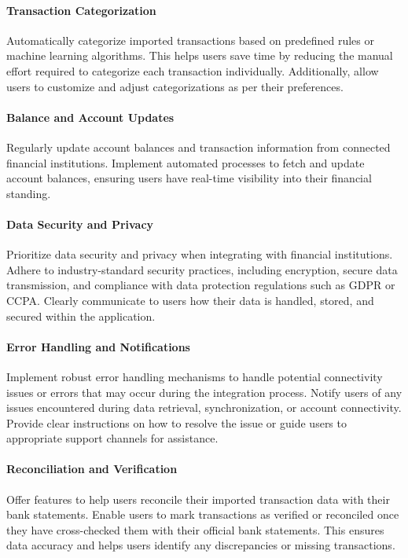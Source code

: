\paragraph{Transaction Categorization}
Automatically categorize imported transactions based on predefined rules or machine 
learning algorithms. This helps users save time by reducing the manual effort required to categorize each transaction
individually. Additionally, allow users to customize and adjust categorizations as per their preferences.

\paragraph{Balance and Account Updates}
Regularly update account balances and transaction information from connected financial 
institutions. Implement automated processes to fetch and update account balances, ensuring users have real-time 
visibility into their financial standing.

\paragraph{Data Security and Privacy}
Prioritize data security and privacy when integrating with financial institutions. Adhere 
to industry-standard security practices, including encryption, secure data transmission, and compliance with data 
protection regulations such as GDPR or CCPA. Clearly communicate to users how their data is handled, stored, and 
secured within the application.

\paragraph{Error Handling and Notifications}
Implement robust error handling mechanisms to handle potential connectivity issues 
or errors that may occur during the integration process. Notify users of any issues encountered during data retrieval, 
synchronization, or account connectivity. Provide clear instructions on how to resolve the issue or guide users to 
appropriate support channels for assistance.

\paragraph{Reconciliation and Verification}
Offer features to help users reconcile their imported transaction data with their 
bank statements. Enable users to mark transactions as verified or reconciled once they have cross-checked them with 
their official bank statements. This ensures data accuracy and helps users identify any discrepancies or missing 
transactions.

